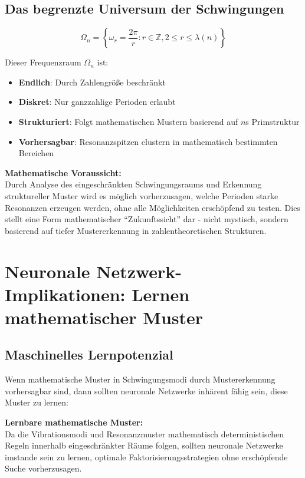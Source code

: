	\subsection{Das begrenzte Universum der Schwingungen}
	
	\begin{equation}
		\Omega_n = \left\{\omega_r = \frac{2\pi}{r} : r \in \mathbb{Z}, 2 \leq r \leq \lambda(n)\right\}
	\end{equation}
	
	Dieser Frequenzraum $\Omega_n$ ist:
	\begin{itemize}
		\item \textbf{Endlich}: Durch Zahlengröße beschränkt
		\item \textbf{Diskret}: Nur ganzzahlige Perioden erlaubt
		\item \textbf{Strukturiert}: Folgt mathematischen Mustern basierend auf $n$s Primstruktur
		\item \textbf{Vorhersagbar}: Resonanzspitzen clustern in mathematisch bestimmten Bereichen
	\end{itemize}
	
	\begin{tcolorbox}[colback=cyan!10,colframe=cyan!50,title=Vorhersageprinzip]
		\textbf{Mathematische Voraussicht:} \\
		Durch Analyse des eingeschränkten Schwingungsraums und Erkennung struktureller Muster wird es möglich vorherzusagen, welche Perioden starke Resonanzen erzeugen werden, ohne alle Möglichkeiten erschöpfend zu testen. Dies stellt eine Form mathematischer ``Zukunftssicht'' dar - nicht mystisch, sondern basierend auf tiefer Mustererkennung in zahlentheoretischen Strukturen.
	\end{tcolorbox}
	
	\section{Neuronale Netzwerk-Implikationen: Lernen mathematischer Muster}
	
	\subsection{Maschinelles Lernpotenzial}
	
	Wenn mathematische Muster in Schwingungsmodi durch Mustererkennung vorhersagbar sind, dann sollten neuronale Netzwerke inhärent fähig sein, diese Muster zu lernen:
	
	\begin{tcolorbox}[colback=green!10,colframe=green!50,title=Neuronales Netzwerk-Hypothese]
		\textbf{Lernbare mathematische Muster:} \\
		Da die Vibrationsmodi und Resonanzmuster mathematisch deterministischen Regeln innerhalb eingeschränkter Räume folgen, sollten neuronale Netzwerke imstande sein zu lernen, optimale Faktorisierungsstrategien ohne erschöpfende Suche vorherzusagen.
	\end{tcolorbox}
	
